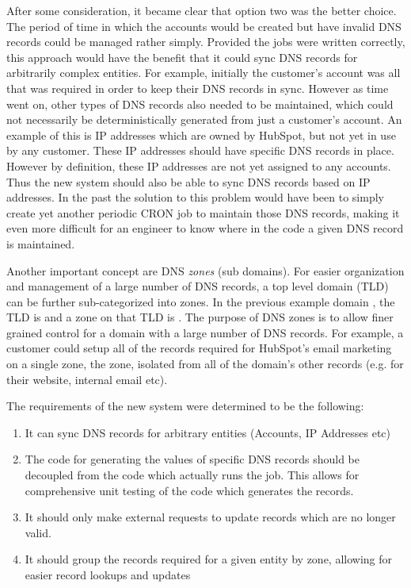 After some consideration, it became clear that option two was the better choice. The period of time in which the accounts would be created but have invalid DNS records could be managed rather simply. Provided the jobs were written correctly, this approach would have the benefit that it could sync DNS records for arbitrarily complex entities. For example, initially the customer's account was all that was required in order to keep their DNS records in sync. However as time went on, other types of DNS records also needed to be maintained, which could not necessarily be deterministically generated from just a customer's account. An example of this is IP addresses which are owned by HubSpot, but not yet in use by any customer. These IP addresses should have specific DNS records in place. However by definition, these IP addresses are not yet assigned to any accounts. Thus the new system should also be able to sync DNS records based on IP addresses. In the past the solution to this problem would have been to simply create yet another periodic CRON job to maintain those DNS records, making it even more difficult for an engineer to know where in the code a given DNS record is maintained.

Another important concept are DNS \textit{zones} (sub domains). For easier organization and management of a large number of DNS records, a top level domain (TLD) can be further sub-categorized into zones. In the previous example domain , the TLD is  and a zone on that TLD is . The purpose of DNS zones is to allow finer grained control for a domain with a large number of DNS records. For example, a customer could setup all of the records required for HubSpot's email marketing on a single zone, the  zone, isolated from all of the domain's other records (e.g. for their website, internal email etc). 

The requirements of the new system were determined to be the following:
\begin{enumerate}
      \item{It can sync DNS records for arbitrary entities (Accounts, IP Addresses etc)}
      \item{The code for generating the values of specific DNS records should be decoupled from the code which actually runs the job. This allows for comprehensive unit testing of the code which generates the records.}
      \item{It should only make external requests to update records which are no longer valid.}
      \item{It should group the records required for a given entity by zone, allowing for easier record lookups and updates}
\end{enumerate}

